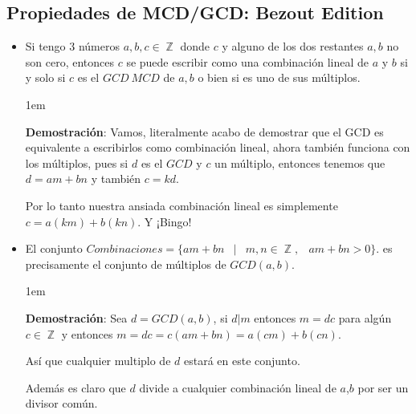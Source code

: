 \documentclass[12pt]{report}                                    %
\newenvironment{SmallIndentation}[1][0.75em]                    %
    {\begin{adjustwidth}{#1}{}\begin{footnotesize}}                 %
    {\end{footnotesize}\end{adjustwidth}}                           %
\DeclareMathOperator \Space {\quad}                             %
\DeclareMathOperator \MiniSpace {\;}                            %
\newcommand \Such {\MiniSpace|\MiniSpace}                       %
\DeclareMathOperator \Integers  {\mathbb{Z}}                     %
\begin{document}
        \clearpage
        \subsection{Propiedades de MCD/GCD: Bezout Edition}
            \begin{itemize}

                \item Si tengo 3 números $a, b, c \in \Integers$ donde $c$ y alguno de los
                dos restantes $a,b$ no son cero, entonces $c$ se puede escribir como
                una combinación lineal de $a$ y $b$ si y solo si $c$ es el $GCD \ MCD$ de
                $a, b$ o bien si es uno de sus múltiplos.

                    \begin{SmallIndentation}[1em]
                        \textbf{Demostración}:
                            Vamos, literalmente acabo de demostrar que el GCD es equivalente
                            a escribirlos como combinación lineal, ahora también funciona con
                            los múltiplos, pues si $d$ es el $GCD$ y $c$ un múltiplo, entonces
                            tenemos que $d=am+bn$ y también $c=kd$.

                            Por lo tanto nuestra ansiada combinación lineal es simplemente
                            $c=a(km)+b(kn)$. Y ¡Bingo!

                    \end{SmallIndentation} 


                \item El conjunto $Combinaciones = \{ am+bn \Such m, n \in \Integers, \MiniSpace am+bn > 0 \}$.
                es precisamente el conjunto de múltiplos de $GCD(a,b)$.

                    \begin{SmallIndentation}[1em]
                        \textbf{Demostración}:
                            Sea $d=GCD(a,b)$, si $d|m$ entonces $m = dc$ para algún $c \in \Integers$
                            y entonces $m = dc = c(am+bn)=a(cm)+b(cn)$.

                            Así que cualquier multiplo de $d$ estará en este conjunto.

                            Además es claro que $d$ divide a cualquier combinación lineal
                            de $a$,$b$ por ser un divisor común.


\end{SmallIndentation}
\end{itemize}
\end{document}
